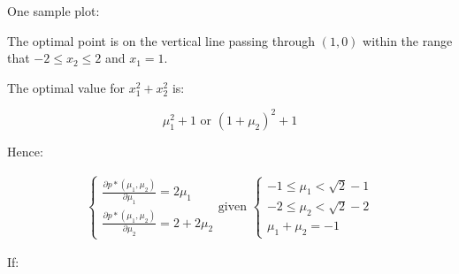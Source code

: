 \documentclass[11pt, letterpaper, titlepage]{article}
\begin{document}
\begin{enumerate}
\begin{enumerate}
        One sample plot:
        
        \begin{center}
        \def\circlee{(1, 1) circle (1)}
        \def\circlef{(1, -1) circle (1)}
        \end{center}
        
        The optimal point is on the vertical line passing through $(1, 0)$ within the range that $-2 \leq x_2 \leq 2$ and $x_1 = 1$.
        
        The optimal value for $x_1^2 + x_2^2$ is:
        
        \begin{equation*}
            \mu_1^2 + 1 \text{ or } (1 + \mu_2)^2 + 1
        \end{equation*}
        
        Hence:
        
        \begin{gather*}
            \begin{cases}
                \frac{\partial p*(\mu_1, \mu_2)}{\partial \mu_1} = 2\mu_1 \\
                \frac{\partial p*(\mu_1, \mu_2)}{\partial \mu_2} = 2 + 2 \mu_2
            \end{cases}
            \text{given }
            \begin{cases}
                - 1 \leq \mu_1 < \sqrt{2} - 1 \\
                - 2 \leq \mu_2 < \sqrt{2} - 2 \\
                \mu_1 + \mu_2 = -1
            \end{cases}
        \end{gather*}
        
        If:
        

\end{enumerate}
\end{enumerate}
\end{document}
